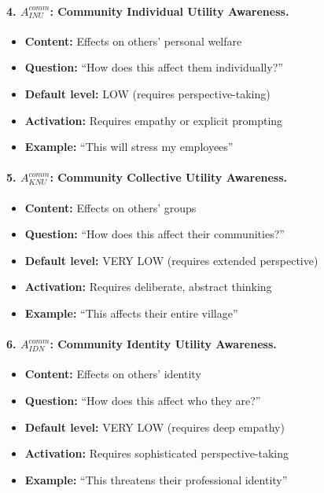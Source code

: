 \paragraph{4. $A^{comm}_{INU}$: Community Individual Utility Awareness.}
\begin{itemize}
\item \textbf{Content:} Effects on others' personal welfare
\item \textbf{Question:} ``How does this affect them individually?''
\item \textbf{Default level:} LOW (requires perspective-taking)
\item \textbf{Activation:} Requires empathy or explicit prompting
\item \textbf{Example:} ``This will stress my employees''
\end{itemize}

\paragraph{5. $A^{comm}_{KNU}$: Community Collective Utility Awareness.}
\begin{itemize}
\item \textbf{Content:} Effects on others' groups
\item \textbf{Question:} ``How does this affect their communities?''
\item \textbf{Default level:} VERY LOW (requires extended perspective)
\item \textbf{Activation:} Requires deliberate, abstract thinking
\item \textbf{Example:} ``This affects their entire village''
\end{itemize}

\paragraph{6. $A^{comm}_{IDN}$: Community Identity Utility Awareness.}
\begin{itemize}
\item \textbf{Content:} Effects on others' identity
\item \textbf{Question:} ``How does this affect who they are?''
\item \textbf{Default level:} VERY LOW (requires deep empathy)
\item \textbf{Activation:} Requires sophisticated perspective-taking
\item \textbf{Example:} ``This threatens their professional identity''
\end{itemize}

